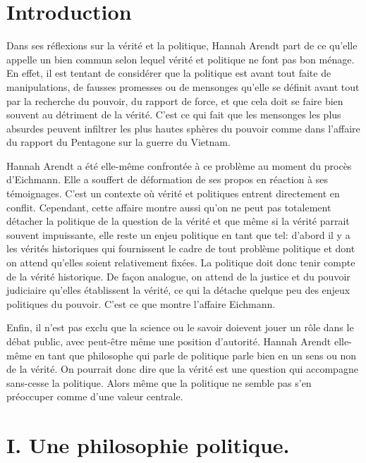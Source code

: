 \documentclass[12pt]{article}
\begin{document}
\section*{\color{red}Introduction}
Dans ses réflexions sur la vérité et la politique, Hannah Arendt part de ce qu'elle appelle un bien commun selon lequel vérité et politique ne font pas bon ménage.
En effet, il est tentant de considérer que la politique est avant tout faite de manipulations, de fausses promesses ou de mensonges qu'elle se définit avant tout par la recherche du pouvoir, du rapport de force, et que cela doit se faire bien souvent au détriment de la vérité.
C'est ce qui fait que les mensonges les plus absurdes peuvent infiltrer les plus hautes sphères du pouvoir comme dans l'affaire du rapport du Pentagone sur la guerre du Vietnam.\par
Hannah Arendt a été elle-même confrontée à ce problème au moment du procès d'Eichmann. Elle a souffert de déformation de ses propos en réaction à ses témoignages.
C'est un contexte où vérité et politiques entrent directement en conflit.
Cependant, cette affaire montre aussi qu'on ne peut pas totalement détacher la politique de la question de la vérité et que même si la vérité parrait souvent impuissante, elle reste un enjeu politique en tant que tel: d'abord il y a les vérités historiques qui fournissent le cadre de tout problème politique et dont on attend qu'elles soient relativement fixées.
La politique doit donc tenir compte de la vérité historique.
De façon analogue, on attend de la justice et du pouvoir judiciaire qu'elles établissent la vérité, ce qui la détache quelque peu des enjeux politiques du pouvoir.
C'est ce que montre l'affaire Eichmann.\par
Enfin, il n'est pas exclu que la science ou le savoir doievent jouer un rôle dans le débat public, avec peut-être même une position d'autorité.
Hannah Arendt elle-même en tant que philosophe qui parle de politique parle bien en un sens ou non de la vérité.
On pourrait donc dire que la vérité est une question qui accompagne sans-cesse la politique.
Alors même que la politique ne semble pas s'en préoccuper comme d'une valeur centrale.
\pagebreak
\section*{\color{red}I. Une philosophie politique.}
\end{document}

